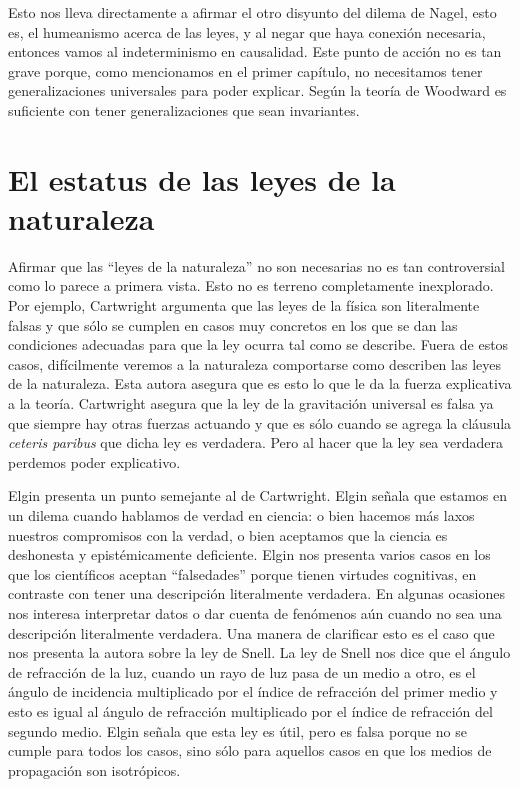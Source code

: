 Esto nos lleva directamente a afirmar el otro disyunto del dilema de Nagel, esto es, el humeanismo acerca de las leyes, y al negar que haya conexión necesaria, entonces vamos al indeterminismo en causalidad. Este punto de acción no es tan grave porque, como mencionamos en el primer capítulo, no necesitamos tener generalizaciones universales para poder explicar. Según la teoría de Woodward es suficiente con tener generalizaciones que sean invariantes.

\section{El estatus de las leyes de la naturaleza}

\noindent Afirmar que las ``leyes de la naturaleza'' no son necesarias no es tan controversial como lo parece a primera vista. Esto no es terreno completamente inexplorado. Por ejemplo, Cartwright \citeyear{Cartwright1983} argumenta que las leyes de la física son literalmente falsas y que sólo se cumplen en casos muy concretos en los que se dan las condiciones adecuadas para que la ley ocurra tal como se describe. Fuera de estos casos, difícilmente veremos a la naturaleza comportarse como describen las leyes de la naturaleza. Esta autora asegura que es esto lo que le da la fuerza explicativa a la teoría. Cartwright asegura que la ley de la gravitación universal es falsa ya que siempre hay otras fuerzas actuando y que es sólo cuando se agrega la cláusula \textit{ceteris paribus} que dicha ley es verdadera. Pero al hacer que la ley sea verdadera perdemos poder explicativo.

Elgin presenta un punto semejante al de Cartwright. Elgin \citeyear{Elgin2004} señala que estamos en un dilema cuando hablamos de verdad en ciencia: o bien hacemos más laxos nuestros compromisos con la verdad, o bien aceptamos que la ciencia es deshonesta y epistémicamente deficiente. Elgin nos presenta varios casos en los que los científicos aceptan ``falsedades'' porque tienen virtudes cognitivas, en contraste con tener una descripción literalmente verdadera. En algunas ocasiones nos interesa interpretar datos o dar cuenta de fenómenos aún cuando no sea una descripción literalmente verdadera. Una manera de clarificar esto es el caso que nos presenta la autora sobre la ley de Snell. La ley de Snell nos dice que el ángulo de refracción de la luz, cuando un rayo de luz pasa de un medio a otro, es el ángulo de incidencia multiplicado por el índice de refracción del primer medio y esto es igual al ángulo de refracción multiplicado por el índice de refracción del segundo medio. Elgin señala que esta ley es útil, pero es falsa porque no se cumple para todos los casos, sino sólo para aquellos casos en que los medios de propagación son isotrópicos.

